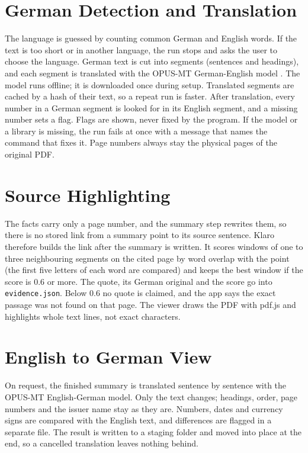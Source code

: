 \documentclass[11pt,a4paper,oneside]{report}
\begin{document}
\section{German Detection and Translation}
The language is guessed by counting common German and English words. If the text is too short or in
another language, the run stops and asks the user to choose the language. German text is cut into
segments (sentences and headings), and each segment is translated with the OPUS-MT German-English model
\cite{tiedemann2020opusmt}. The model runs offline; it is downloaded once during setup. Translated
segments are cached by a hash of their text, so a repeat run is faster. After translation, every number
in a German segment is looked for in its English segment, and a missing number sets a flag. Flags are
shown, never fixed by the program. If the model or a library is missing, the run fails at once with a
message that names the command that fixes it. Page numbers always stay the physical pages of the
original PDF.

\section{Source Highlighting}
The facts carry only a page number, and the summary step rewrites them, so there is no stored link from a
summary point to its source sentence. Klaro therefore builds the link after the summary is written. It
scores windows of one to three neighbouring segments on the cited page by word overlap with the point
(the first five letters of each word are compared) and keeps the best window if the score is 0.6 or
more. The quote, its German original and the score go into \texttt{evidence.json}. Below 0.6 no quote is
claimed, and the app says the exact passage was not found on that page. The viewer draws the PDF with
pdf.js and highlights whole text lines, not exact characters.

\section{English to German View}
On request, the finished summary is translated sentence by sentence with the OPUS-MT English-German
model. Only the text changes; headings, order, page numbers and the issuer name stay as they are.
Numbers, dates and currency signs are compared with the English text, and differences are flagged in a
separate file. The result is written to a staging folder and moved into place at the end, so a
cancelled translation leaves nothing behind.
\end{document}
